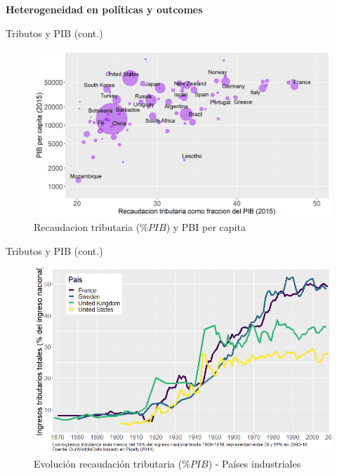 \documentclass[
  ignorenonframetext,
]{beamer}
\begin{document}
\begin{frame}{\textbf{Heterogeneidad en políticas y outcomes}}
\begin{block}{Tributos y PIB (cont.)}
\begin{figure}
{\centering \includegraphics{fig/fig-01-004.png}

}

\caption{Recaudacion tributaria (\(\%PIB\)) y PBI per capita}

\end{figure}
\end{block}

\begin{block}{Tributos y PIB (cont.)}
\protect\hypertarget{tributos-y-pib-cont.-1}{}
\begin{figure}

{\centering \includegraphics{fig/fig-01-005.png}

}

\caption{Evolución recaudación tributaria (\(\%PIB\)) - Países
industriales}

\end{figure}
\end{block}
\end{frame}
\end{document}
